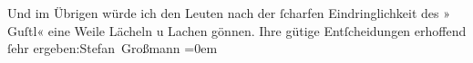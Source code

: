 \begin{ledgroupsized}[t]{13cm}
           \pstart
           Und im Übrigen würde ich den Leuten nach der ſcharfen Eindringlichkeit des »\label{T_L01717_2v}\label{T_L01717_2h} Guſtl«
               eine  Weile Lächeln u Lachen gönnen.\pend
           \pstart
           Ihre gütige Entſcheidungen erhoffend{\\[\baselineskip]}ſehr ergeben:\spacefill\mbox{Stefan
                  Großmann}\pend
           \leftskip=0em{}
         
         \endnumbering{}\end{ledgroupsized}  \newcommand{\dateiname}{L01717}\newcommand{\titel}{Stefan Großmann an Arthur Schnitzler, 7. 10. 1907}\newcommand{\editorInnen}{ Martin Anton Müller und Gerd-Hermann Susen}
      
